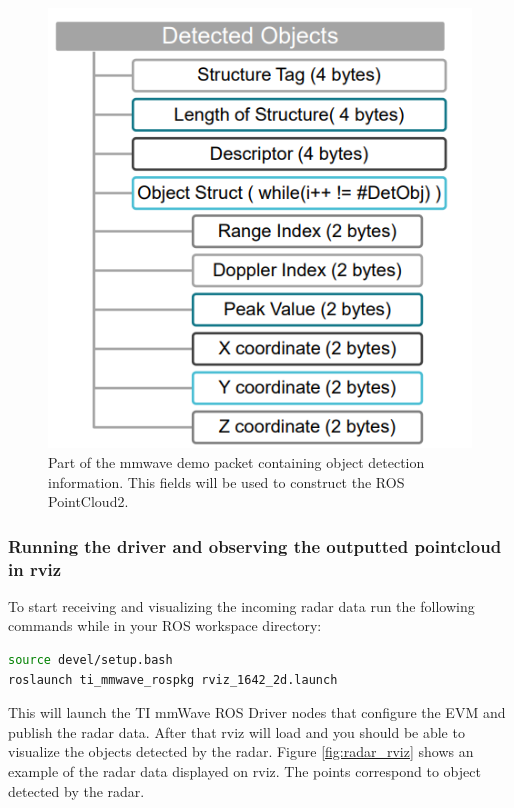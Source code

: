 \documentclass[12pt]{article}
\begin{document}
\begin{figure}[!htb]
    \centering
    \includegraphics[scale=0.5]{2_demo_vis_struct.PNG}
    \caption{Part of the mmwave demo packet containing object detection information. This fields will be used to construct the ROS PointCloud2.}
    \label{fig:my_label}
\end{figure}
\subsubsection{Running the driver and observing the outputted pointcloud in rviz}
To start receiving and visualizing the incoming radar data run the following commands while in your ROS workspace directory:
 \begin{lstlisting}[language=bash]
source devel/setup.bash
roslaunch ti_mmwave_rospkg rviz_1642_2d.launch
\end{lstlisting}
This will launch the TI mmWave ROS Driver nodes that configure the EVM and publish the radar data. After that rviz will load and you should be able to visualize the objects detected by the radar. Figure \ref{fig:radar_rviz} shows an example of the radar data displayed on rviz. The points correspond to object detected by the radar.
\end{document}
